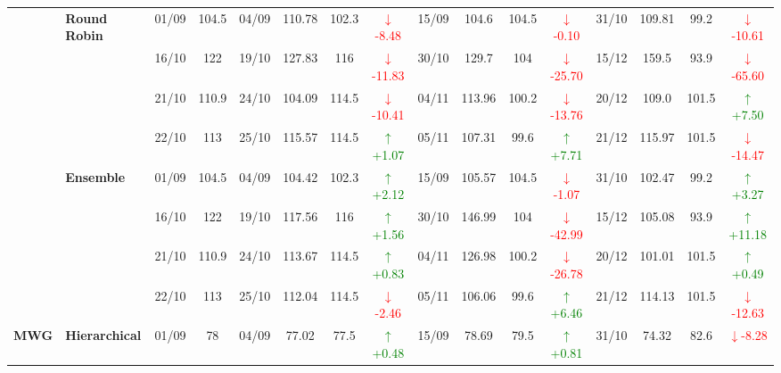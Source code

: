 {\begin{longtable}{llcc|cccc|cccc|cccc}
& \textbf{Round Robin}
& 01/09 & 104.5 & 04/09 & 110.78 & 102.3 & \textcolor{red}{\(\downarrow\)-8.48} & 15/09 & 104.6 & 104.5 & \textcolor{red}{\(\downarrow\)-0.10} & 31/10 & 109.81 & 99.2 & \textcolor{red}{\(\downarrow\)-10.61} \\

&
& 16/10 & 122 & 19/10 & 127.83 & 116 & \textcolor{red}{\(\downarrow\)-11.83} & 30/10 & 129.7 & 104 & \textcolor{red}{\(\downarrow\)-25.70} & 15/12 & 159.5 & 93.9 & \textcolor{red}{\(\downarrow\)-65.60} \\

&
& 21/10 & 110.9 & 24/10 & 104.09 & 114.5 & \textcolor{red}{\(\downarrow\)-10.41} & 04/11 & 113.96 & 100.2 & \textcolor{red}{\(\downarrow\)-13.76} & 20/12 & 109.0 & 101.5 & \textcolor{green}{\(\uparrow\)+7.50} \\

&
& 22/10 & 113 & 25/10 & 115.57 & 114.5 & \textcolor{green}{\(\uparrow\)+1.07} & 05/11 & 107.31 & 99.6 & \textcolor{green}{\(\uparrow\)+7.71} & 21/12 & 115.97 & 101.5 & \textcolor{red}{\(\downarrow\)-14.47} \\
\cmidrule(lr){2-16}


& \textbf{Ensemble}
& 01/09 & 104.5 & 04/09 & 104.42 & 102.3 & \textcolor{green}{\(\uparrow\)+2.12} & 15/09 & 105.57 & 104.5 & \textcolor{red}{\(\downarrow\)-1.07} & 31/10 & 102.47 & 99.2 & \textcolor{green}{\(\uparrow\)+3.27} \\

&
& 16/10 & 122 & 19/10 & 117.56 & 116 & \textcolor{green}{\(\uparrow\)+1.56} & 30/10 & 146.99 & 104 & \textcolor{red}{\(\downarrow\)-42.99} & 15/12 & 105.08 & 93.9 & \textcolor{green}{\(\uparrow\)+11.18} \\

&
& 21/10 & 110.9 & 24/10 & 113.67 & 114.5 & \textcolor{green}{\(\uparrow\)+0.83} & 04/11 & 126.98 & 100.2 & \textcolor{red}{\(\downarrow\)-26.78} & 20/12 & 101.01 & 101.5 & \textcolor{green}{\(\uparrow\)+0.49} \\

&
& 22/10 & 113 & 25/10 & 112.04 & 114.5 & \textcolor{red}{\(\downarrow\)-2.46} & 05/11 & 106.06 & 99.6 & \textcolor{green}{\(\uparrow\)+6.46} & 21/12 & 114.13 & 101.5 & \textcolor{red}{\(\downarrow\)-12.63} \\
\midrule




\multirow{12}{*}{\textbf{MWG}} 
& \textbf{Hierarchical}
& 01/09 & 78 & 04/09 & 77.02 & 77.5 & \textcolor{green}{\(\uparrow\)+0.48} & 15/09 & 78.69 & 79.5 & \textcolor{green}{\(\uparrow\)+0.81} & 31/10 & 74.32 & 82.6 & \textcolor{red}{\(\downarrow\)-8.28} \\


\end{longtable}}
